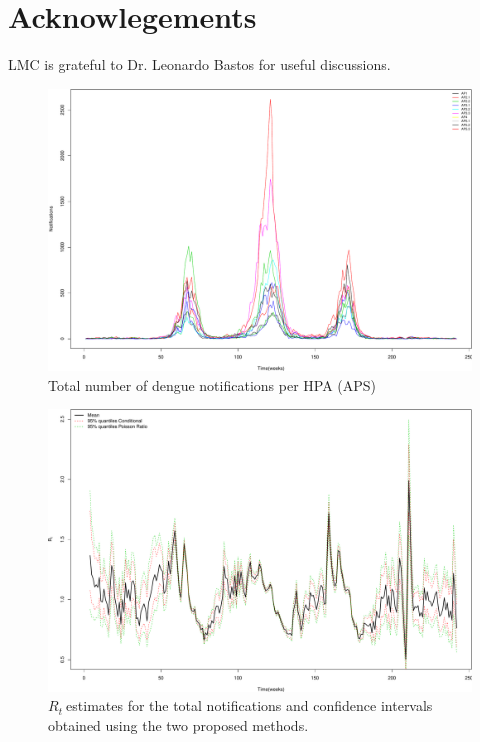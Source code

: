 \documentclass[12pt]{article}
\def \rr {$R_{t}\ $}
\begin{document}
\section{Acknowlegements}
LMC is grateful to Dr. Leonardo Bastos for useful discussions.
\newpage
\begin{figure}[!h]
\begin{center}
\includegraphics{FIGURES/figure-002}
\end{center}
\caption{Total number of dengue notifications per HPA (APS)}
\label{fig:casesperAPS}
\end{figure}
\begin{figure}[!h]
\begin{center}
\includegraphics{FIGURES/figure-003}
\end{center}
\caption{\rr estimates for the total notifications and confidence intervals obtained using the two proposed methods.}
\label{fig:confidencetotals}
\end{figure}
\end{document}
